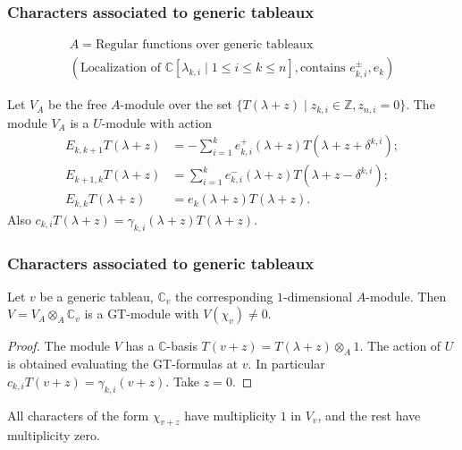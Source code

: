 \documentclass[smaller,usepdftitle=false]{beamer}
\newcommand\CC{\mathbb C}
\newcommand\ZZ{\mathbb Z}
\newcommand\ot{\otimes}
\begin{document}
\begin{frame}
\frametitle{Characters associated to generic tableaux}
\vspace{-1cm}
\begin{gather*}
A = \mbox{Regular functions over generic tableaux}  \\
(\mbox{Localization of }\CC[\lambda_{k,i} \mid 1 \leq i \leq k \leq n], 
\mbox{contains } e^\pm_{k,i}, e_k) 
\end{gather*}

\begin{Theorem}
Let $V_A$ be the free $A$-module over the set $\{T(\lambda + z) \mid z_{k,i} 
\in \ZZ, z_{n,i} = 0\}$. The module $V_A$ is a $U$-module with 
action
\vspace{-.3cm}
\begin{align*}
E_{k,k+1} T(\lambda + z) &= - \sum_{i=1}^k e^+_{k,i}(\lambda + z) 
	T(\lambda + z+\delta^{k,i}); \\
E_{k+1,k} T(\lambda + z) &= \sum_{i=1}^k e^-_{k,i}(\lambda + z) 
	T(\lambda + z -\delta^{k,i}); \\
E_{k,k} T(\lambda + z) &= e_k(\lambda + z) T(\lambda + z).
\end{align*}
Also $c_{k,i} T(\lambda + z) = \gamma_{k,i}(\lambda + z) T(\lambda + z)$.
\end{Theorem}
\end{frame}

\begin{frame}
\frametitle{Characters associated to generic tableaux}
\begin{Corollary}
Let $v$ be a generic tableau, $\CC_v$ the corresponding $1$-dimensional 
$A$-module. Then $V = V_A \ot_A \CC_v$ is a GT-module with $V(\chi_v) \neq
0$. 
\end{Corollary}
\begin{proof}
The module $V$ has a $\CC$-basis $T(v + z) = T(\lambda + z) \ot_A 1$. The 
action of $U$ is obtained evaluating the GT-formulas at $v$. In particular
$c_{k,i} T(v+z) = \gamma_{k,i}(v+z)$. Take $z=0$.
\end{proof}
All characters of the form $\chi_{v+z}$ have multiplicity $1$ in $V_v$, and
the rest have multiplicity zero.
\end{frame}
\end{document}
